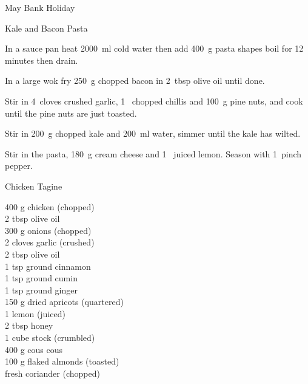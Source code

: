 \begin{menu}{May Bank Holiday}
\begin{recipe}{2}{Kale and Bacon Pasta}
\begin{ingredients}
		\end{ingredients}
	
    \begin{instructions}
    \item 
      In a sauce pan heat
      2000~ml  cold water then add
      400~g  pasta shapes
      boil for 12
      minutes then drain.
    \item 
        In a large wok fry
        250~g chopped bacon
        in
        2~tbsp  olive oil
        until done.
      \item 
        Stir in 
        4~cloves crushed garlic,
        1~ chopped chillis
        and
        100~g  pine nuts,
        and cook until the pine nuts are just toasted.
      \item 
        Stir in
        200~g chopped kale
        and
        200~ml  water,
        simmer until the kale has wilted.
      \item 
        Stir in the pasta,
        180~g  cream cheese
        and
        1~ juiced lemon.
        Season with 
        1~pinch  pepper.
      
    \end{instructions}
    \end{recipe}%
  
    \begin{recipe}{2}{Chicken Tagine}%
    
		\begin{ingredients}
		400 g chicken (chopped) \\
	2 tbsp olive oil  \\
	300 g onions (chopped) \\
	2 cloves garlic (crushed) \\
	2 tbsp olive oil  \\
	1 tsp ground cinnamon  \\
	1 tsp ground cumin  \\
	1 tsp ground ginger  \\
	150 g dried apricots (quartered) \\
	1  lemon (juiced) \\
	2 tbsp honey  \\
	1 cube stock (crumbled) \\
	400 g cous cous  \\
	100 g flaked almonds (toasted) \\
	  fresh coriander (chopped) \\
	
		\end{ingredients}
	

\end{recipe}
\end{menu}
